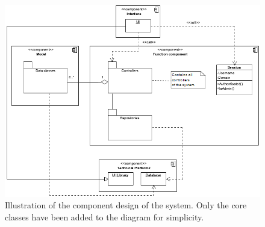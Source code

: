 \begin{figure}[H]
    \centering
    \includegraphics[width=1.3\textwidth,angle=90,origin=c]{figures/ComponentDiagrams/ConnectionOfComponents.png}
    \caption{Illustration of the component design of the system. Only the core classes have been added to the diagram for simplicity.}
    \label{fig:FinalComponentDesign}
\end{figure}